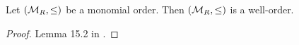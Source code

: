 \begin{comment}
\begin{proposition}
  Let $\leq$ be a monomial order. Then
  \label{prop_monomial_order}
  \begin{enumerate}[label=(\roman*)]
    \item
      if $a \leq b$ and $x \leq y$, then $ax \leq by$;
    \item
      $\leq$ is a well-order; and
    \item
      every strictly decreasing sequence of monomials
      \[ m_1 > m_2 > \dots \]
      eventually terminates.
  \end{enumerate}
\end{proposition}
\begin{proof}
  \begin{enumerate}[label=(\roman*)]
    \item
      Suppose $a \leq b$ and $x \leq y$.
      By property (ii), we have $ax \leq bx$ and $bx \leq by$.
      Total orders are transitive, so $ax \leq by$.
    
    \item
      (See \cite{eisenbud95} Lemma 15.2.)
      Let $M \subseteq \cal M$ be any subset of $R$'s monomials.
      
      Consider the $R$-ideal generated by $M$, $I = \pid M$.
      Since $R$ is Noetherian, $I$ is generated by a finite subset of $M$, say
        \[ I = \pid{m_1, \ldots, m_k}. \]
      Since $\leq$ is total, the finite set $\{ m_1, \ldots, m_k \}$ has a least element, $m_i$.
      We show now that $m_i$ is the least element of $M$.
      
      Let $m$ be any other monomial in $M$ .
      Then $m \in \pid{M}$, hence $m$ is an $R$-linear combination of the monomials in $\{ m_1, \ldots, m_k \}$.
      However, since $m$ is a \emph{monomial}, $m$ is simply a monomial times one of the $m_j$'s,
        \[ m = m'm_j \text{ for some }1 \leq j \leq k. \]
      By property (i), we have $1 \leq m'$.
      By $m_i$ being minimal among $\{ m_1, \ldots, m_k \}$, we have $m_i \leq m_j$.
      By part (i) of this proposition, we have $m_i \leq m'm_j = m$.
    
    \item
      Let $m_1 > m_2 > \dots$ be a strictly decreasing sequence of monomials.
      If the sequence does not terminate, then $\{m_1, m_2, \ldots\}$ is an infinite subset of $\cal M_R$ with no least element,
      contradicting well-orderedness.
  \end{enumerate}
\end{proof}
Once we describe a generalized polynomial long division algorithm,
part (iii) of this proposition will be vital in proving the algorithm terminates.
\end{comment}
\begin{proposition}
  \label{prop_monomial_order_well_ordered}
  Let $(\cal M_R, \leq)$ be a monomial order.
  Then $(\cal M_R, \leq)$ is a well-order.
\end{proposition}
\begin{proof}
  Lemma 15.2 in \cite{eisenbud95}.
\end{proof}

